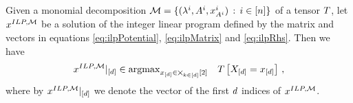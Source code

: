\begin{theorem}
	Given a monomial decomposition $\mathcal{M}=\{(\lambda^{i}, A^{i}, x_{A^{i}}^{i}) \, : \, i\in[n]\}$ of a tensor $T$, let  $x^{ILP,\mathcal{M}}$ be a solution of the integer linear program defined by the matrix and vectors in equations \eqref{eq:ilpPotential}, \eqref{eq:ilpMatrix} and \eqref{eq:ilpRhs}.
	Then we have
		\[ {x^{ILP,\mathcal{M}}}|_{[d]} \in \mathrm{argmax}_{x_{[d]}\in\bigtimes_{k\in[d]}[2]} \quad T\left[X_{[d]}=x_{[d]}\right] \, ,\]
	where by  ${x^{ILP,\mathcal{M}}}|_{[d]}$ we denote the vector of the first $d$ indices of $x^{ILP,\mathcal{M}}$.
\end{theorem}
